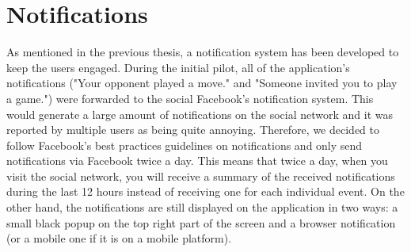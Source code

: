 \section{Notifications}
As mentioned in the previous thesis, a notification system has been developed to keep the users engaged. During the initial pilot, all of the application's notifications ("Your opponent played a move." and "Someone invited you to play a game.") were forwarded to the social Facebook's notification system. This would generate a large amount of notifications on the social network and it was reported by multiple users as being quite annoying.
Therefore, we decided to follow Facebook's best practices guidelines on notifications \cite{fbappnotif} and only send notifications via Facebook twice a day. This means that twice a day, when you visit the social network, you will receive a summary of the received notifications during the last 12 hours instead of receiving one for each individual event. On the other hand, the notifications are still displayed on the application in two ways: a small black popup on the top right part of the screen and a browser notification \cite{browsernotif} (or a mobile one if it is on a mobile platform).


